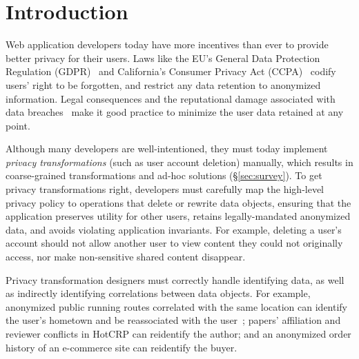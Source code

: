 \section{Introduction}
Web application developers today have more incentives than ever to provide better privacy for their
users.
%
Laws like the EU's General Data Protection Regulation (GDPR)~\cite{eu:gdpr} and California's
Consumer Privacy Act (CCPA)~\cite{ca:privacy-act} codify users' right to be forgotten, and restrict
any data retention to anonymized information.
%
Legal consequences and the reputational damage associated with data breaches~\cite{breach:amazon,
breach:twitter, breach:fb, breach:marriott, breach:quora} make it good practice to minimize the user
data retained at any point.
%

%
Although many developers are well-intentioned, they must today implement \emph{privacy
transformations} (such as user account deletion) manually, which results in coarse-grained
transformations and ad-hoc solutions (\S\ref{sec:survey}).
%
To get privacy transformations right, developers must carefully map the high-level privacy
policy to operations that delete or rewrite data objects, ensuring that the application preserves
utility for other users, retains legally-mandated anonymized data, and avoids violating
application invariants.
%
For example, deleting a user's account should not allow another user to view content they could
not originally access, nor make non-sensitive shared content disappear.
%

%
Privacy transformation designers must correctly handle identifying data, as well as indirectly identifying
correlations between data objects.
%
For example, anonymized public running routes correlated with the same location can identify the
user's hometown and be reassociated with the user~\cite{strava:heatmap};
papers' affiliation and reviewer conflicts in HotCRP can reidentify the author; and an anonymized
order history of an e-commerce site can reidentify the buyer.
%

